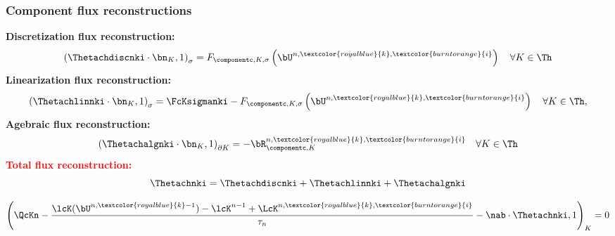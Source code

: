 \documentclass[10 pt]{beamer}
\begin{document}
\begin{frame}
\frametitle{Component flux reconstructions}
\textcolor{cadmiumgreen}{\textbf{Discretization flux reconstruction:}}
\begin{equation*}
\left(\Thetachdiscnki \cdot \bn_K,1 \right)_{\sigma} = F_{\componentc,K,\sigma}\left(\bU^{n,\textcolor{royalblue}{k}, \textcolor{burntorange}{i}}\right) \quad \forall K \in \Th
\end{equation*}
\vspace{-0.1 cm}
\textcolor{cadmiumgreen}{\textbf{Linearization flux reconstruction:}}
\begin{equation*}
\left(\Thetachlinnki \cdot \bn_K,1 \right)_{\sigma} = \FcKsigmanki -  F_{\componentc,K,\sigma}\left(\bU^{n,\textcolor{royalblue}{k}, \textcolor{burntorange}{i}}\right) \quad \forall K \in \Th,
\end{equation*}
\vspace{-0.1 cm}
\textcolor{cadmiumgreen}{\textbf{Agebraic flux reconstruction:}}
\begin{equation*}
\left(\Thetachalgnki \cdot \bn_K,1 \right)_{\partial K} = - {\bR}_{\componentc,K}^{n,\textcolor{royalblue}{k}, \textcolor{burntorange}{i}} \quad \forall K \in \Th
\end{equation*}
\textcolor{red}{\textbf{Total flux reconstruction:}} 
\begin{equation*}
\Thetachnki = \Thetachdiscnki+\Thetachlinnki+\Thetachalgnki
\end{equation*}
\vspace{-0.2 cm}
\begin{proposition}
\begin{equation*}
\left(\QcKn - \frac{\lcK(\bU^{n,\textcolor{royalblue}{k}-1})-\lcK^{n-1} + \LcK^{n,\textcolor{royalblue}{k}, \textcolor{burntorange}{i}}}{\tau_n} - \nab \cdot \Thetachnki,1\right)_K=0
\end{equation*}
\end{proposition}
\end{frame}
\end{document}

